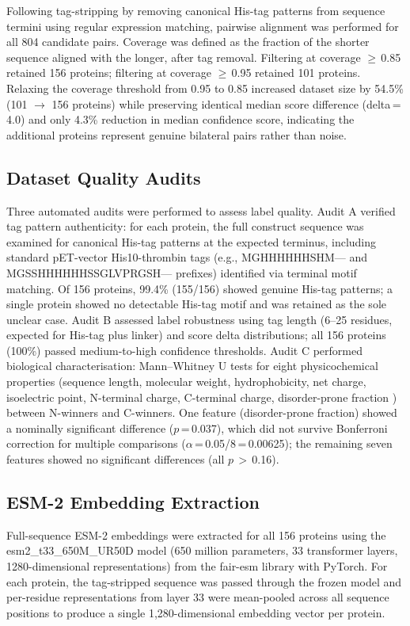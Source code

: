 \documentclass[unnumsec,webpdf,contemporary,large]{oup-authoring-template}
\begin{document}
Following tag-stripping by removing canonical His-tag patterns from sequence termini using regular expression matching, pairwise alignment was performed for all 804 candidate pairs. Coverage was defined as the fraction of the shorter sequence aligned with the longer, after tag removal. Filtering at coverage $\geq$\,0.85 retained 156 proteins; filtering at coverage $\geq$\,0.95 retained 101 proteins. Relaxing the coverage threshold from 0.95 to 0.85 increased dataset size by 54.5\% (101 $\rightarrow$ 156 proteins) while preserving identical median score difference (delta\,=\,4.0) and only 4.3\% reduction in median confidence score, indicating the additional proteins represent genuine bilateral pairs rather than noise.

\subsection{Dataset Quality Audits}
Three automated audits were performed to assess label quality. Audit A verified tag pattern authenticity: for each protein, the full construct sequence was examined for canonical His-tag patterns at the expected terminus, including standard pET-vector His10-thrombin tags (e.g., MGHHHHHHSHM--- and MGSSHHHHHHSSGLVPRGSH--- prefixes) identified via terminal motif matching. Of 156 proteins, 99.4\% (155/156) showed genuine His-tag patterns; a single protein showed no detectable His-tag motif and was retained as the sole unclear case. Audit B assessed label robustness using tag length (6--25 residues, expected for His-tag plus linker) and score delta distributions; all 156 proteins (100\%) passed medium-to-high confidence thresholds. Audit C performed biological characterisation: Mann--Whitney U tests for eight physicochemical properties (sequence length, molecular weight, hydrophobicity, net charge, isoelectric point, N-terminal charge, C-terminal charge, disorder-prone fraction \citep{uversky2019}) between N-winners and C-winners. One feature (disorder-prone fraction) showed a nominally significant difference ($p$\,=\,0.037), which did not survive Bonferroni correction for multiple comparisons ($\alpha$\,=\,0.05/8\,=\,0.00625); the remaining seven features showed no significant differences (all $p$\,$>$\,0.16).

\subsection{ESM-2 Embedding Extraction}
Full-sequence ESM-2 embeddings were extracted for all 156 proteins using the esm2\_t33\_650M\_UR50D model (650 million parameters, 33 transformer layers, 1280-dimensional representations) from the fair-esm library with PyTorch. For each protein, the tag-stripped sequence was passed through the frozen model and per-residue representations from layer 33 were mean-pooled across all sequence positions to produce a single 1,280-dimensional embedding vector per protein.
\end{document}
